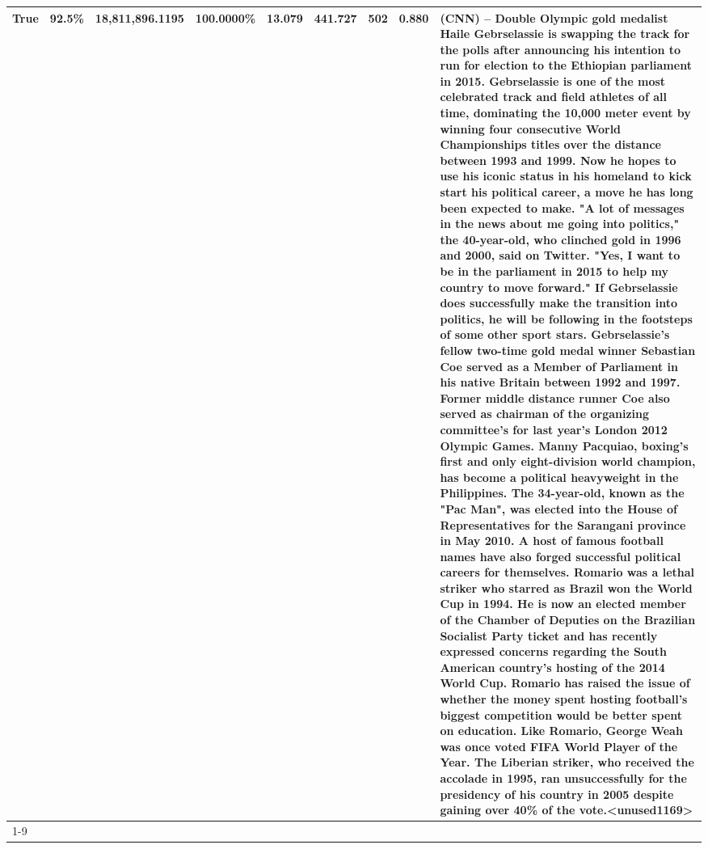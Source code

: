\begin{table}[H]
{\begin{tabular}{lllrlllll}
True & 92.5\% & 18,811,896.1195 & \bfseries \color{red} 100.0000\% & 13.079 & 441.727 & 502 & 0.880 & (CNN) -- Double Olympic gold medalist Haile Gebrselassie is swapping the track for the polls after announcing his intention to run for election to the Ethiopian parliament in 2015. Gebrselassie is one of the most celebrated track and field athletes of all time, dominating the 10,000 meter event by winning four consecutive World Championships titles over the distance between 1993 and 1999. Now he hopes to use his iconic status in his homeland to kick start his political career, a move he has long been expected to make. "A lot of messages in the news about me going into politics," the 40-year-old, who clinched gold in 1996 and 2000, said on Twitter. "Yes, I want to be in the parliament in 2015 to help my country to move forward." If Gebrselassie does successfully make the transition into politics, he will be following in the footsteps of some other sport stars. Gebrselassie's fellow two-time gold medal winner Sebastian Coe served as a Member of Parliament in his native Britain between 1992 and 1997. Former middle distance runner Coe also served as chairman of the organizing committee's for last year's London 2012 Olympic Games. Manny Pacquiao, boxing's first and only eight-division world champion, has become a political heavyweight in the Philippines. The 34-year-old, known as the "Pac Man", was elected into the House of Representatives for the Sarangani province in May 2010. A host of famous football names have also forged successful political careers for themselves. Romario was a lethal striker who starred as Brazil won the World Cup in 1994. He is now an elected member of the Chamber of Deputies on the Brazilian Socialist Party ticket and has recently expressed concerns regarding the South American country's hosting of the 2014 World Cup. Romario has raised the issue of whether the money spent hosting football's biggest competition would be better spent on education. Like Romario, George Weah was once voted FIFA World Player of the Year. The Liberian striker, who received the accolade in 1995, ran unsuccessfully for the presidency of his country in 2005 despite gaining over 40\% of the vote.<unused1169> \\
\cline{1-9}

\end{tabular}}
\end{table}
